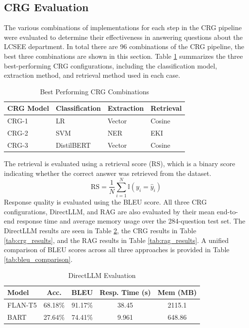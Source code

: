 \documentclass[conference]{IEEEtran}
\begin{document}
\subsection{CRG Evaluation}
The various combinations of implementations for each step in the CRG pipeline were evaluated to determine their effectiveness in answering questions about the LCSEE department.
In total there are 96 combinations of the CRG pipeline, the best three combinations are shown in this section. 
Table \ref{tab:crg_combinations} summarizes the three best-performing CRG configurations, including the classification model, extraction method, and retrieval method used in each case.

\begin{table}[!ht]
    \centering
    \caption{Best Performing CRG Combinations}
    \label{tab:crg_combinations}
    \begin{tabular}{l|l|l|l}
        \toprule
        \textbf{CRG Model} & \textbf{Classification} & \textbf{Extraction} & \textbf{Retrieval} \\
        \midrule
        CRG-1 & LR & Vector & Cosine \\
        CRG-2 & SVM & NER & EKI \\
        CRG-3 & DistilBERT & Vector & Cosine \\
        \bottomrule
    \end{tabular}
\end{table}

The retrieval is evaluated using a retrieval score ($\text{RS}$), which is a binary score indicating whether the correct answer was retrieved from the dataset. 
\begin{equation}
    \text{RS} = \frac{1}{N} \sum_{i=1}^{N} \mathbb{I}(y_i = \hat{y}_i)
\end{equation}
Response quality is evaluated using the BLEU score.
All three CRG configurations, DirectLLM, and RAG are also evaluated by their mean end-to-end response time and average memory usage over the 284-question test set.
The DirectLLM results are seen in Table \ref{tab:directllm_results}, the CRG results in Table \ref{tab:crg_results}, and the RAG results in Table \ref{tab:rag_results}.
A unified comparison of BLEU scores across all three approaches is provided in Table \ref{tab:bleu_comparison}.

\begin{table}[!ht]
    \centering
    \caption{DirectLLM Evaluation}
    \label{tab:directllm_results}
    \begin{tabular}{l|c|c|c|c}
        \toprule
        \textbf{Model} & \textbf{Acc.} & \textbf{BLEU} & \textbf{Resp. Time (s)} & \textbf{Mem (MB)} \\
        \midrule
        FLAN-T5 & 68.18\% & 91.17\% & 38.45  & 2115.1  \\
        BART    & 27.64\% & 74.41\% & 9.961  & 648.86  \\
        \bottomrule
    \end{tabular}
\end{table}
\end{document}
